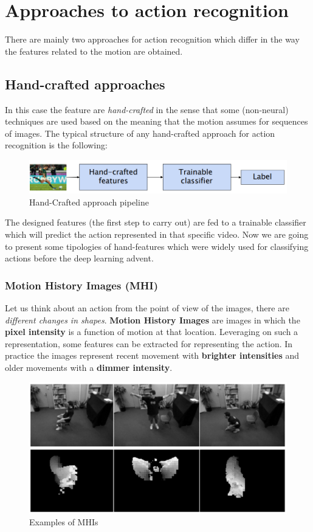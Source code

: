 \section{Approaches to action recognition}
There are mainly two approaches for action recognition which differ in the way the features related to the motion are obtained.

\subsection{Hand-crafted approaches}
In this case the feature are \textit{hand-crafted} in the sense that some (non-neural) techniques are used based on the meaning that the motion assumes for sequences of images. The typical structure of any hand-crafted approach for action recognition is the following: 

\begin{figure}[h]
    \centering
    \includegraphics[scale=0.7]{img/handCraft.png}
    \caption{Hand-Crafted approach pipeline}
\end{figure}

The designed features (the first step to carry out) are fed to a trainable classifier which will predict the action represented in that specific video. Now we are going to present some tipologies of hand-features which were widely used for classifying actions before the deep learning advent.

\subsubsection{Motion History Images (MHI)}
Let us think about an action from the point of view of the images, there are \textit{different changes in shapes}. \textbf{Motion History Images} are images in which the \textbf{pixel intensity} is a function of motion at that location. Leveraging on such a representation, some features can be extracted for representing the action. In practice the images represent recent movement with \textbf{brighter intensities} and older movements with a \textbf{dimmer intensity}.

\begin{figure}[h]
    \centering
    \includegraphics[scale=0.7]{img/MHI.png}
    \caption{Examples of MHIs}
\end{figure}


